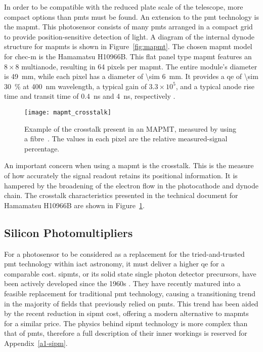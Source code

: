 In order to be compatible with the reduced plate scale of the telescope, more compact options than \glspl{pmt} must be found. An extension to the \gls{pmt} technology is the \gls{mapmt}. This photosensor consists of many \glspl{pmt} arranged in a compact grid to provide position-sensitive detection of light. A diagram of the internal dynode structure for \glspl{mapmt} is shown in Figure~\ref{fig:mapmt}. The chosen \gls{mapmt} model for \gls{chec-m} is the Hamamatsu H10966B. This flat panel type \gls{mapmt} features an $8 \times 8$ multianode, resulting in 64 pixels per \gls{mapmt}. The entire module's diameter is \SI{49}{mm}, while each pixel has a diameter of \SI{\sim 6}{mm}. It provides a \gls{qe} of \SI{\sim 30}{\percent} at \SI{400}{nm} wavelength, a typical gain of $3.3 \times 10^5$, and a typical anode rise time and transit time of \SI{0.4}{ns} and \SI{4}{ns}, respectively \cite{Hamamatsu2011}. 

\begin{figure}
	\centering
    \texttt{[image: mapmt\_crosstalk]} 
	\caption[Multi-Anode Photomultiplier Tube crosstalk.]{Example of the crosstalk present in an MAPMT, measured by using a fibre~\cite{Hamamatsu2011}. The values in each pixel are the relative measured-signal percentage.}
	\label{fig:mapmt_crosstalk}
\end{figure}

An important concern when using a \gls{mapmt} is the crosstalk. This is the measure of how accurately the signal readout retains its positional information. It is hampered by the broadening of the electron flow in the photocathode and dynode chain. The crosstalk characteristics presented in the technical document for Hamamatsu H10966B are shown in Figure~\ref{fig:mapmt_crosstalk}.

\subsection{Silicon Photomultipliers}

For a photosensor to be considered as a replacement for the tried-and-trusted \gls{pmt} technology within \gls{iact} astronomy, it must deliver a higher \gls{qe} for a comparable cost. \glspl{sipmt}, or its solid state single photon detector precursors, have been actively developed since the 1960s \cite{Renker2006}. They have recently matured into a feasible replacement for traditional \gls{pmt} technology, causing a transitioning trend in the majority of fields that previously relied on \glspl{pmt}. This trend has been aided by the recent reduction in \gls{sipmt} cost, offering a modern alternative to \glspl{mapmt} for a similar price. The physics behind \gls{sipmt} technology is more complex than that of \glspl{pmt}, therefore a full description of their inner workings is reserved for Appendix~\ref{a1-sipm}.

